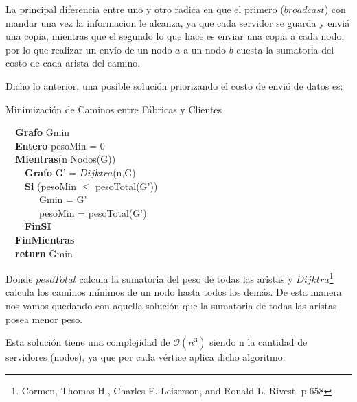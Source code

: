 La principal diferencia entre uno y otro radica en que el primero ($broadcast$) con mandar una vez la informacion le alcanza, ya que cada servidor se guarda y enviá una copia, mientras que el segundo lo que hace es enviar una copia a cada nodo, por lo que realizar un envío de un nodo $a$ a un nodo $b$ cuesta la sumatoria del costo de cada arista del camino. \newline

 Dicho lo anterior, una posible solución priorizando el costo de envió de datos es: \newline

\begin{algorithm}[H]
	\SetAlgoLined
	\caption{Minimización de Caminos entre Fábricas y Clientes}
	\ \ \textbf{Grafo} Gmin \\
	\ \ \textbf{Entero} pesoMin = 0 \\
	\ \ \textbf{Mientras}(n \in Nodos(G)) \\
				\ \ \ \ \textbf{Grafo} G' = $Dijktra$(n,G) \\
				\ \ \ \ \textbf{Si} (pesoMin $\leq$ pesoTotal(G')) \\
	      \ \ \ \ \ \ \ Gmin = G' \\
	      \ \ \ \ \ \ \ pesoMin = pesoTotal(G') \\
				\ \ \ \ \textbf{FinSI} \\
		\ \ \textbf{FinMientras} \\
		\ \ \textbf{return} Gmin 
\end{algorithm}

Donde $pesoTotal$ calcula la sumatoria del peso de todas las aristas y  $Dijktra$\footnote{Cormen, Thomas H., Charles E. Leiserson, and Ronald L. Rivest. p.658} calcula los caminos mínimos de un nodo hasta todos los demás. De esta manera nos vamos quedando con aquella solución que la sumatoria de todas las aristas posea menor peso. \newline

Esta solución tiene una complejidad de $\mathcal{O}(n^{3})$ siendo n la cantidad de servidores (nodos), ya que por cada vértice aplica dicho algoritmo.\newline
